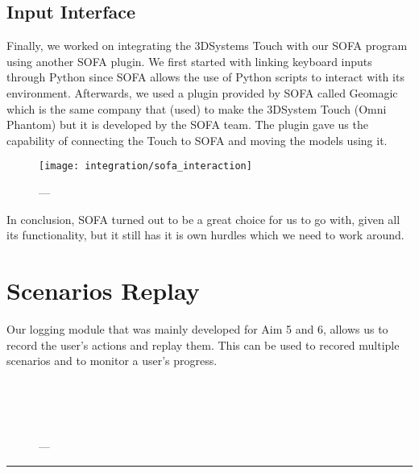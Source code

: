 \subsection{Input Interface}
Finally, we worked on integrating the 3DSystems Touch with our SOFA program using another SOFA plugin. We first started with linking keyboard inputs through Python since SOFA allows the use of Python scripts to interact with its environment. Afterwards, we used a plugin provided by SOFA called Geomagic which is the same company that (used) to make the 3DSystem Touch (Omni Phantom) but it is developed by the SOFA team. The plugin gave us the capability of connecting the Touch to SOFA and moving the models using it.

\begin{figure}
  \centering%
  \texttt{[image: integration/sofa\_interaction]}
  \caption{---}\label{fig:sofa_interaction}
\end{figure}

In conclusion, SOFA turned out to be a great choice for us to go with, given all its functionality, but it still has it is own hurdles which we need to work around.

\section{Scenarios Replay}\label{sec:replay}
Our logging module that was mainly developed for Aim 5 and 6, allows us to record the user's actions and replay them. This can be used to recored multiple scenarios and to monitor a user's progress.


\begin{figure}
  \centering%
  \setlength{\fboxsep}{0pt}%
  \setlength{\fboxrule}{0.1pt}%
  \hfill%
  \\[1.5ex]%
  \hfill%
  \\[1.5ex]%
  \hfill%
  \\[1.5ex]%
  \caption{---}\label{fig:cuts}
\end{figure}

\hrule%

\clearpage%
